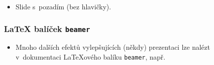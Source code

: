 \documentclass[c, 10pt]{beamer}
\begin{document}
{
\begin{frame}[plain]

\begin{itemize}\itemsep=1em
\item \textcolor{rred}{Slide s~pozadím (bez hlavičky).}
\end{itemize}

\end{frame}
}

\begin{frame}\frametitle{{\LaTeX} balíček \texttt{beamer}}

\begin{itemize}
\item Mnoho dalších efektů vylepšujících (někdy) prezentaci lze
  nalézt v~dokumentaci {\LaTeX}ového balíku \alert{\texttt{beamer}}, např.

  \medskip
  \begin{flushleft}\footnotesize
   \\
  \end{flushleft}
\end{itemize}
\end{frame}
\end{document}
